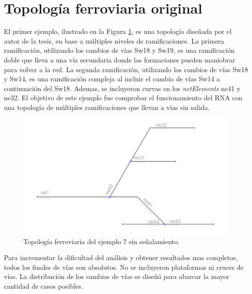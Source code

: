 \section{Topología ferroviaria original}

	El primer ejemplo, ilustrado en la Figura \ref{fig:EJ7_1}, es una topología diseñada por el autor de la tesis, en base a múltiples niveles de ramificaciones. La primera ramificación, utilizando los cambios de vías Sw18 y Sw19, es una ramificación doble que lleva a una vía secundaria donde las formaciones pueden maniobrar para volver a la red. La segunda ramificación, utilizando los cambios de vías Sw18 y Sw14, es una ramificación compleja al incluir el cambio de vías Sw14 a continuación del Sw18. Ademas, se incluyeron curvas en los \textit{netElements} ne41 y ne32. El objetivo de este ejemplo fue comprobar el funcionamiento del RNA con una topología de múltiples ramificaciones que llevan a vías sin salida.	
	
	\begin{figure}[h]
		\centering
		\includegraphics[width=1\textwidth]{resultados-obtenidos/ejemplo7/images/7_empty.png}
		\centering\caption{Topología ferroviaria del ejemplo 7 sin señalamiento.}
		\label{fig:EJ7_1}
	\end{figure}
	
	Para incrementar la dificultad del análisis y obtener resultados mas completos, todos los finales de vías son absolutos. No se incluyeron plataformas ni cruces de vías. La distribución de los cambios de vías se diseñó para abarcar la mayor cantidad de casos posibles.